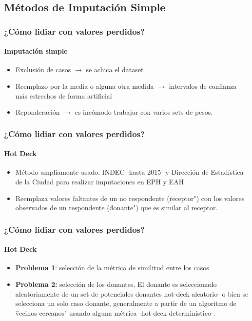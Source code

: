 \documentclass{beamer}
\begin{document}
\subsection{Métodos de Imputación Simple}
\begin{frame}
	\frametitle{¿Cómo lidiar con valores perdidos?}
	\framesubtitle{Imputación simple}
		\begin{itemize}
			\item Exclusión de casos $\rightarrow$ se achica el dataset			\item Reemplazo por la media o alguna otra medida $\rightarrow$ intervalos de confianza más estrechos de forma artificial
			\item Reponderación $\rightarrow$ es incómodo trabajar con varios sets de pesos.
		\end{itemize}
\end{frame}

\begin{frame}
\frametitle{¿Cómo lidiar con valores perdidos?}
\framesubtitle{Hot Deck}
\begin{itemize}
	\item Método ampliamente usado. INDEC -hasta 2015- y Dirección de
	Estadística de la Ciudad para realizar imputaciones en EPH y EAH
	\item Reemplaza valores faltantes de un no respondente (\"receptor") con
	los valores observados de un respondente (\"donante") que es similar
	al receptor.
\end{itemize}
\end{frame}


\begin{frame}
\frametitle{¿Cómo lidiar con valores perdidos?}
\framesubtitle{Hot Deck}
\begin{itemize}
	\item \textbf{Problema 1}: selección de la métrica de similitud entre los casos
	\item \textbf{Problema 2:} selección  de los donantes. El donante es seleccionado aleatoriamente de un set de potenciales donantes hot-deck aleatorio- o bien se selecciona un solo caso donante, generalmente a partir de un algoritmo de \"vecinos cercanos" usando alguna métrica -hot-deck determinístico-.
	\end{itemize}
\end{frame}
\end{document}
